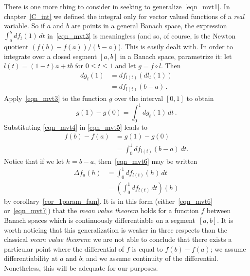 There is one more thing to consider in seeking to generalize~\eqref{eqn_mvt1}.  In
chapter~\ref{C_int} we defined the integral only for vector valued functions of a \emph{real}
variable.  So if $a$ and $b$ are points in a general Banach space, the expression $\int_a^b
df_t(1)\,dt$ in~\eqref{eqn_mvt3} is meaningless (and so, of course, is the Newton quotient
$(f(b)-f(a))/(b-a)$).  This is easily dealt with.  In order to integrate over a closed segment
$[a,b]$ in a Banach space, parametrize it: let $l(t) = (1 - t)a + tb$ for $0 \leq t \leq 1$
and let $g = f\circ l$. Then
 \begin{equation}\label{eqn_mvt4}
     \begin{aligned}
                dg_t(1) &= df_{l(t)}(dl_t(1)) \\
                        &= df_{l(t)}(b - a)\,.
     \end{aligned}
 \end{equation}
Apply~\eqref{eqn_mvt3} to the function $g$ over the interval $[0,1]$ to obtain
 \begin{equation}\label{eqn_mvt5}
                g(1) - g(0) = \int_0^1dg_t(1)\,dt\,.
 \end{equation}
Substituting \eqref{eqn_mvt4} in \eqref{eqn_mvt5} leads to
 \begin{equation}\label{eqn_mvt6}
     \begin{aligned}
           f(b) - f(a) &= g(1) - g(0)  \\
                       &= \int_0^1df_{l(t)}(b - a)\,dt.
     \end{aligned}
 \end{equation}
Notice that if we let $h = b - a$, then~\eqref{eqn_mvt6} may be
written
 \begin{equation}\label{eqn_mvt7}
     \begin{aligned}
          \Delta f_a(h) &= \int_0^1df_{l(t)}(h)\,dt\\
                        &= \left(\int_0^1df_{l(t)}\,dt\right)(h)
     \end{aligned}
 \end{equation}
by corollary~\ref{cor_1param_fam}.  It is in this form (either~\eqref{eqn_mvt6}
or~\eqref{eqn_mvt7}) that the \emph{mean value theorem} holds for a function $f$ between
Banach spaces which is continuously differentiable on a segment~$[a,b]$. It is worth noticing
that this generalization is weaker in three respects than the classical \emph{mean value
theorem}: we are not able to conclude that there exists a particular point where the
differential of $f$ is equal to $f(b)-f(a)$; we assume differentiability at $a$ and $b$; and
we assume continuity of the differential.  Nonetheless, this will be adequate for our
purposes.

